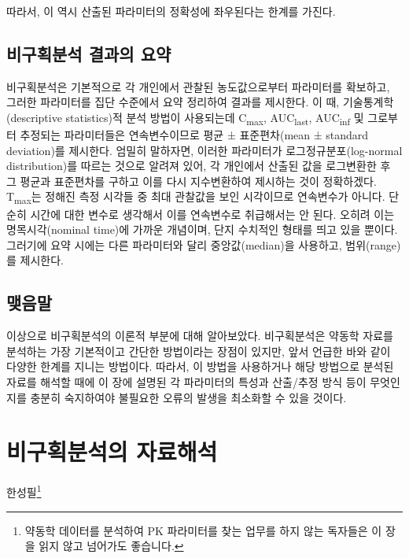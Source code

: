 \documentclass[
  11pt,
  krantz2, a4paper, twoside]{krantz}
\theoremstyle{definition}
\theoremstyle{definition}
\theoremstyle{definition}
\theoremstyle{definition}
\theoremstyle{remark}
\begin{document}
따라서, 이 역시 산출된 파라미터의 정확성에 좌우된다는 한계를 가진다.

\hypertarget{uxbe44uxad6cuxd68duxbd84uxc11d-uxacb0uxacfcuxc758-uxc694uxc57d}{%
\section{비구획분석 결과의 요약}\label{uxbe44uxad6cuxd68duxbd84uxc11d-uxacb0uxacfcuxc758-uxc694uxc57d}}

비구획분석은 기본적으로 각 개인에서 관찰된 농도값으로부터 파라미터를 확보하고, 그러한 파라미터를 집단 수준에서 요약 정리하여 결과를 제시한다.
이 때, 기술통계학(descriptive statistics)적 분석 방법이 사용되는데 C\textsubscript{max}, AUC\textsubscript{last}, AUC\textsubscript{inf} 및 그로부터 추정되는 파라미터들은 연속변수이므로 평균 ± 표준편차(mean ± standard deviation)를 제시한다.
엄밀히 말하자면, 이러한 파라미터가 로그정규분포(log-normal distribution)를 따르는 것으로 알려져 있어, 각 개인에서 산출된 값을 로그변환한 후 그 평균과 표준편차를 구하고 이를 다시 지수변환하여 제시하는 것이 정확하겠다.
T\textsubscript{max}는 정해진 측정 시각들 중 최대 관찰값을 보인 시각이므로 연속변수가 아니다.
단순히 시간에 대한 변수로 생각해서 이를 연속변수로 취급해서는 안 된다.
오히려 이는 명목시각(nominal time)에 가까운 개념이며, 단지 수치적인 형태를 띄고 있을 뿐이다.
그러기에 요약 시에는 다른 파라미터와 달리 중앙값(median)을 사용하고, 범위(range)를 제시한다.

\hypertarget{uxb9fauxc74cuxb9d0-1}{%
\section{맺음말}\label{uxb9fauxc74cuxb9d0-1}}

이상으로 비구획분석의 이론적 부분에 대해 알아보았다.
비구획분석은 약동학 자료를 분석하는 가장 기본적이고 간단한 방법이라는 장점이 있지만, 앞서 언급한 바와 같이 다양한 한계를 지니는 방법이다. 
따라서, 이 방법을 사용하거나 해당 방법으로 분석된 자료를 해석할 때에 이 장에 설명된 각 파라미터의 특성과 산출/추정 방식 등이 무엇인지를 충분히 숙지하여야 불필요한 오류의 발생을 최소화할 수 있을 것이다.

\hypertarget{nca-analysis}{%
\chapter{비구획분석의 자료해석}\label{nca-analysis}}

\Large\hfill

한성필\footnote{약동학 데이터를 분석하여 PK 파라미터를 찾는 업무를 하지 않는 독자들은 이 장을 읽지 않고 넘어가도 좋습니다.}
\normalsize
\end{document}
